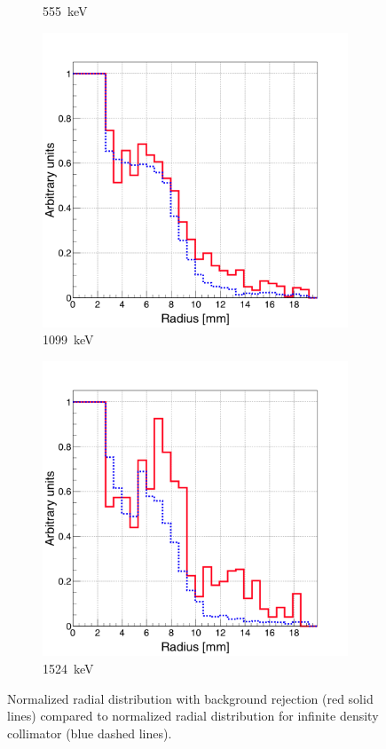 \begin{figure}
\begin{subfigure}{.5\textwidth}
  \caption{555~keV}
  \label{chap5::fig::rad_distr_infAbs_555keV}
\end{subfigure}
\begin{subfigure}{.5\textwidth}
  \centering
  \includegraphics[width=.9\linewidth]{03_GraphicFiles/chapter5_SPECTsimu/SPECT/anger/inf_abs/overlap_infAbs_1099keV_normMax}
  \caption{1099~keV}
  \label{chap5::fig::rad_distr_infAbs_1099keV}
\end{subfigure}
\begin{subfigure}{.5\textwidth}
  \centering
  \includegraphics[width=.9\linewidth]{03_GraphicFiles/chapter5_SPECTsimu/SPECT/anger/inf_abs/overlap_infAbs_1524keV_normMax}
  \caption{1524~keV}
  \label{chap5::fig::rad_distr_infAbs_1524keV}
\end{subfigure}
\caption{Normalized radial distribution with background rejection (red solid lines) compared to normalized radial distribution for infinite density collimator (blue dashed lines).}
\label{chap5::fig::distr_infAbs}
\end{figure}

